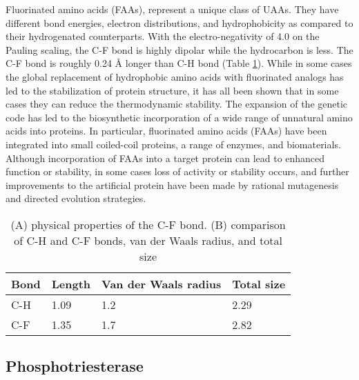 \begin{refsection}
Fluorinated amino acids (FAAs), represent a unique class of UAAs. They have
different bond energies, electron distributions, and
hydrophobicity\cite{Biffinger2004} as compared to their hydrogenated
counterparts. With the electro-negativity of 4.0 on the Pauling scaling, the
C-F bond is highly dipolar while the hydrocarbon is less. The C-F bond is
roughly 0.24 {\AA} longer than C-H bond (Table
\ref{tab:c-fbond})\cite{Tang2001}. While in some cases the global replacement
of hydrophobic amino acids with fluorinated analogs has led to the
stabilization of protein structure\cite{Biffinger2004}, it has all been shown
that in some cases they can reduce the thermodynamic
stability\cite{Panchenko2006b}. The expansion of the genetic code has led to
the biosynthetic incorporation of a wide range of unnatural amino acids into
proteins\cite{Voloshchuk2010}. In particular, fluorinated amino acids (FAAs)
have been integrated into small coiled-coil
proteins\cite{Montclare2009b,Tang2001}, a range of
enzymes\cite{Voloshchuk2009,Panchenko2006b,Voloshchuk2007b,Mehta2011b,Hammill2007},
and biomaterials\cite{Yuvienco2012b}. Although incorporation of FAAs into a
target protein can lead to enhanced function or stability, in some cases loss
of activity or stability occurs, and further improvements to the artificial
protein have been made by rational mutagenesis\cite{Voloshchuk2007b} and
directed evolution strategies\cite{Montclare2006b}.
\begin{table}[h!]
\centering
\begin{tabular}{ llll }
  \hline
  Bond & Length & Van der Waals radius & Total size \\
  \hline

  C-H & 1.09 & 1.2 & 2.29 \\
  C-F & 1.35 & 1.7 & 2.82 \\

  \hline
\end{tabular}
\caption[(A) physical properties of the C-F bond. (B) comparison of C-H and C-F
bonds, van der Waals radius, and total size]{(A) physical properties of the C-F
bond. (B) comparison of C-H and C-F bonds, van der Waals radius, and total
size\cite{Tang2001,Odar2015}}
\label{tab:c-fbond}
\end{table}

\subsection{Phosphotriesterase} 
\label{sec:pte-intro}


\end{refsection}
